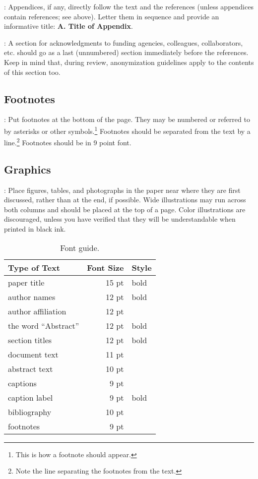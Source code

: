 \documentclass[11pt,letterpaper]{article}
\begin{document}
: Appendices, if any, directly follow the text and
the references (unless appendices contain references; see above). Letter
them in sequence and provide an informative title: {\bf A. Title of Appendix}.

: A section for acknowledgments to funding
agencies, colleagues, collaborators, etc. should go as a last (unnumbered)
section immediately before the references. Keep in mind that, during review,
anonymization guidelines apply to the contents of this section too.

\subsection{Footnotes}

: Put footnotes at the bottom of the page. They may be
numbered or referred to by asterisks or other symbols.\footnote{This is
how a footnote should appear.} Footnotes should be separated from the text
by a line.\footnote{Note the line separating the footnotes from the text.}
Footnotes should be in 9 point font.

\subsection{Graphics}

: Place figures, tables, and photographs in the
paper near where they are first discussed, rather than at the end, if possible.
Wide illustrations may run across both columns and should be placed at the
top of a page. Color illustrations are discouraged, unless you have verified
that they will be understandable when printed in black ink. 

\begin{table}
\small
\centering
\begin{tabular}{|l|rl|}
\hline \bf Type of Text & \bf Font Size & \bf Style \\ \hline
paper title & 15 pt & bold \\
author names & 12 pt & bold \\
author affiliation & 12 pt & \\
the word ``Abstract'' & 12 pt & bold \\
section titles & 12 pt & bold \\
document text & 11 pt  &\\
abstract text & 10 pt & \\
captions & 9 pt & \\
caption label & 9 pt & bold \\
bibliography & 10 pt & \\
footnotes & 9 pt & \\
\hline
\end{tabular}
\caption{\label{font-table} Font guide.}
\end{table}
\end{document}
